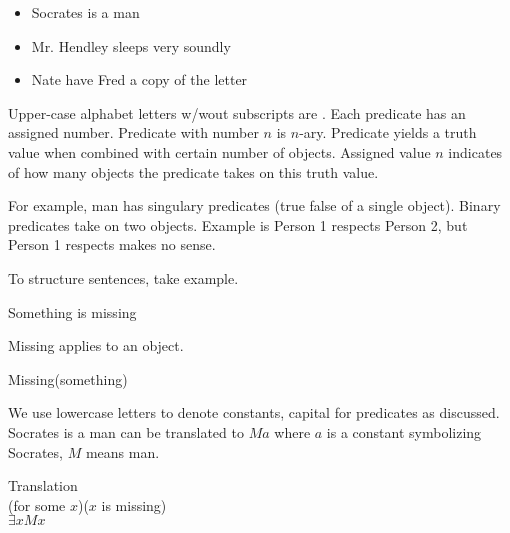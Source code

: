 \begin{itemize}
    \item Socrates is a man
    \item Mr. Hendley sleeps very soundly
    \item Nate have Fred a copy of the letter
\end{itemize}

Upper-case alphabet letters w/wout subscripts are . Each predicate has an assigned number.
Predicate with number $n$ is $n$-ary. Predicate yields a truth value when combined with certain number of objects.
Assigned value $n$ indicates of how many objects the predicate takes on this truth value.

For example, man has singulary predicates (true false of a single object). Binary predicates take on two objects. Example is Person 1 respects Person 2, but Person 1 respects makes no sense.

To structure sentences, take example.

\begin{example}
    Something is missing
\end{example}

Missing applies to an object.

\begin{example}
    Missing(something)
\end{example}

We use lowercase letters to denote constants, capital for predicates as discussed.
Socrates is a man can be translated to $Ma$ where $a$ is a constant symbolizing Socrates, $M$ means man.

\begin{example} Translation\\
    (for some $x$)($x$ is missing)\\
    $\exists x M x$
\end{example}
